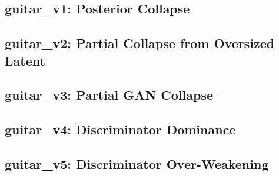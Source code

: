 \subsection{guitar\_v1: Posterior Collapse}

\subsection{guitar\_v2: Partial Collapse from Oversized Latent}

\subsection{guitar\_v3: Partial GAN Collapse}

\subsection{guitar\_v4: Discriminator Dominance}

\subsection{guitar\_v5: Discriminator Over-Weakening}


